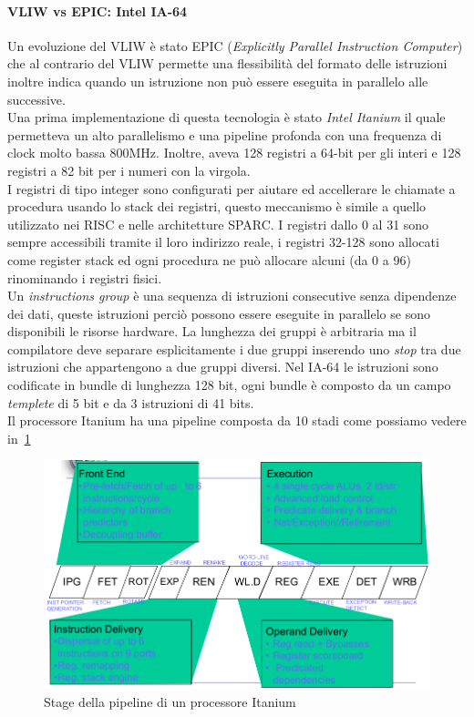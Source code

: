 \paragraph{VLIW vs EPIC: Intel IA-64}
Un evoluzione del VLIW è stato EPIC (\emph{Explicitly Parallel Instruction Computer}) che al contrario del VLIW permette una flessibilità del formato delle istruzioni inoltre indica quando un istruzione non può essere eseguita in parallelo alle successive.\\
Una prima implementazione di questa tecnologia è stato \emph{Intel Itanium} il quale permetteva un alto parallelismo e una pipeline profonda con una frequenza di clock molto bassa 800MHz. Inoltre, aveva 128 registri a 64-bit per gli interi e 128 registri a 82 bit per i numeri con la virgola.\\
I registri di tipo integer sono configurati per aiutare ed accellerare le chiamate a procedura usando lo stack dei registri, questo meccanismo è simile a quello utilizzato nei RISC e nelle architetture SPARC. I registri dallo 0 al 31 sono sempre accessibili tramite il loro indirizzo reale, i registri 32-128 sono allocati come register stack ed ogni procedura ne può allocare alcuni (da 0 a 96) rinominando i registri fisici.\\
Un \emph{instructions group} è una sequenza di istruzioni consecutive senza dipendenze dei dati, queste istruzioni perciò possono essere eseguite in parallelo se sono disponibili le risorse hardware. La lunghezza dei gruppi è arbitraria ma il compilatore deve separare esplicitamente i due gruppi inserendo uno \emph{stop} tra due istruzioni che appartengono a due gruppi diversi. Nel IA-64 le istruzioni sono codificate in bundle di lunghezza 128 bit, ogni bundle è composto da un campo \emph{templete} di 5 bit e da 3 istruzioni di 41 bits.\\
Il processore Itanium ha una pipeline composta da 10 stadi come possiamo vedere in \figurename\,\ref{fig:itapipe}
\begin{figure}
\centering
\includegraphics[scale=0.4]{img/itapipe.png}
\caption{Stage della pipeline di un processore Itanium}\label{fig:itapipe}
\end{figure}

